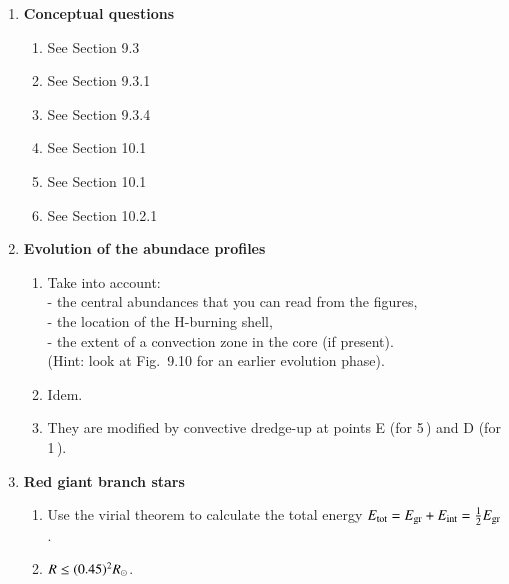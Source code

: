 \documentclass[11pt,a4paper,fleqn]{report}
\begin{document}

\begin{enumerate}
  
\item {\bf Conceptual questions}
  \begin{enumerate}

  \item See Section 9.3
    
  \item See Section 9.3.1
    
  \item See Section 9.3.4
    
  \item See Section 10.1
    
  \item See Section 10.1

  \item See Section 10.2.1

  \end{enumerate}


\item {\bf Evolution of the abundace profiles}

  \begin{enumerate}
  \item Take into account: \\
    - the central abundances that you can read from the figures, \\
    - the location of the H-burning shell, \\
    - the extent of a convection zone in the core (if present). \\
    (Hint: look at Fig.~9.10 for an earlier evolution phase).

  \item Idem.

  \item They are modified by convective dredge-up at points E (for
    5\,\Msun) and D (for 1\,\Msun).

  \end{enumerate}


\item {\bf Red giant branch stars}
    
  \begin{enumerate}
  \item Use the virial theorem to calculate the total energy $E_{\rm
      tot} = E_{\rm gr} + E_{\rm int} = {\textstyle\frac{1}{2}} E_{\rm gr}$.

  \item $R \leq (0.45)^2 {R}_\odot$.
       

\end{enumerate}
\end{enumerate}
\end{document}
